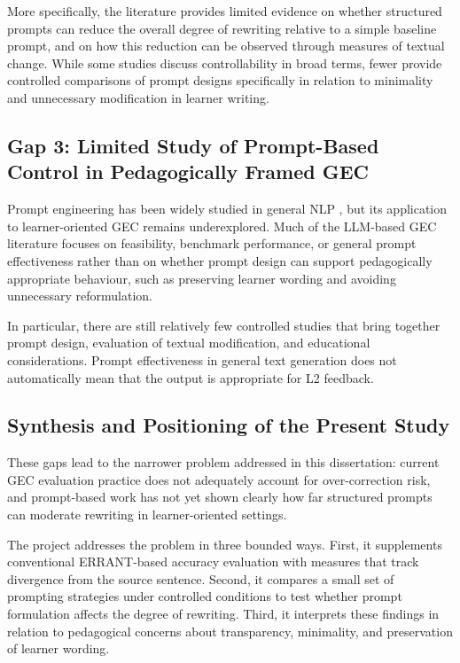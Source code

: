 More specifically, the literature provides limited evidence on whether structured prompts can reduce the overall degree of rewriting relative to a simple baseline prompt, and on how this reduction can be observed through measures of textual change. While some studies discuss controllability in broad terms, fewer provide controlled comparisons of prompt designs specifically in relation to minimality and unnecessary modification in learner writing.

\subsection{Gap 3: Limited Study of Prompt-Based Control in Pedagogically Framed GEC}

Prompt engineering has been widely studied in general NLP \cite{liu2023pretrain,wei2022finetuned}, but its application to learner-oriented GEC remains underexplored. Much of the LLM-based GEC literature focuses on feasibility, benchmark performance, or general prompt effectiveness rather than on whether prompt design can support pedagogically appropriate behaviour, such as preserving learner wording and avoiding unnecessary reformulation.

In particular, there are still relatively few controlled studies that bring together prompt design, evaluation of textual modification, and educational considerations. Prompt effectiveness in general text generation does not automatically mean that the output is appropriate for L2 feedback.

\subsection*{Synthesis and Positioning of the Present Study}

These gaps lead to the narrower problem addressed in this dissertation: current GEC evaluation practice does not adequately account for over-correction risk, and prompt-based work has not yet shown clearly how far structured prompts can moderate rewriting in learner-oriented settings.

The project addresses the problem in three bounded ways. First, it supplements conventional ERRANT-based accuracy evaluation with measures that track divergence from the source sentence. Second, it compares a small set of prompting strategies under controlled conditions to test whether prompt formulation affects the degree of rewriting. Third, it interprets these findings in relation to pedagogical concerns about transparency, minimality, and preservation of learner wording.

